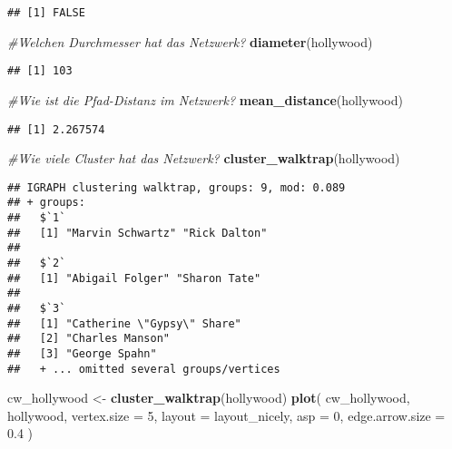 \documentclass[
]{article}
\newenvironment{Shaded}{\begin{snugshade}}{\end{snugshade}}
\newcommand{\CommentTok}[1]{\textcolor[rgb]{0.56,0.35,0.01}{\textit{#1}}}
\newcommand{\DataTypeTok}[1]{\textcolor[rgb]{0.13,0.29,0.53}{#1}}
\newcommand{\DecValTok}[1]{\textcolor[rgb]{0.00,0.00,0.81}{#1}}
\newcommand{\FloatTok}[1]{\textcolor[rgb]{0.00,0.00,0.81}{#1}}
\newcommand{\KeywordTok}[1]{\textcolor[rgb]{0.13,0.29,0.53}{\textbf{#1}}}
\newcommand{\NormalTok}[1]{#1}
\newcommand{\StringTok}[1]{\textcolor[rgb]{0.31,0.60,0.02}{#1}}
\begin{document}
\begin{verbatim}
## [1] FALSE
\end{verbatim}

\begin{Shaded}
\begin{Highlighting}[]
\CommentTok{#Welchen    Durchmesser hat das Netzwerk?}
\KeywordTok{diameter}\NormalTok{(hollywood)}
\end{Highlighting}
\end{Shaded}

\begin{verbatim}
## [1] 103
\end{verbatim}

\begin{Shaded}
\begin{Highlighting}[]
\CommentTok{#Wie    ist die Pfad-Distanz    im  Netzwerk?}
\KeywordTok{mean_distance}\NormalTok{(hollywood)}
\end{Highlighting}
\end{Shaded}

\begin{verbatim}
## [1] 2.267574
\end{verbatim}

\begin{Shaded}
\begin{Highlighting}[]
\CommentTok{#Wie    viele   Cluster hat das Netzwerk?}
\KeywordTok{cluster_walktrap}\NormalTok{(hollywood)}
\end{Highlighting}
\end{Shaded}

\begin{verbatim}
## IGRAPH clustering walktrap, groups: 9, mod: 0.089
## + groups:
##   $`1`
##   [1] "Marvin Schwartz" "Rick Dalton"    
##   
##   $`2`
##   [1] "Abigail Folger" "Sharon Tate"   
##   
##   $`3`
##   [1] "Catherine \"Gypsy\" Share"                       
##   [2] "Charles Manson"                                  
##   [3] "George Spahn"                                    
##   + ... omitted several groups/vertices
\end{verbatim}

\begin{Shaded}
\begin{Highlighting}[]
\NormalTok{cw_hollywood <-}\StringTok{ }\KeywordTok{cluster_walktrap}\NormalTok{(hollywood)}
\KeywordTok{plot}\NormalTok{(}
\NormalTok{  cw_hollywood,}
\NormalTok{  hollywood,}
  \DataTypeTok{vertex.size =} \DecValTok{5}\NormalTok{,}
  \DataTypeTok{layout =}\NormalTok{ layout_nicely,}
  \DataTypeTok{asp =} \DecValTok{0}\NormalTok{,}
  \DataTypeTok{edge.arrow.size =} \FloatTok{0.4}
\NormalTok{)}
\end{Highlighting}
\end{Shaded}
\end{document}
